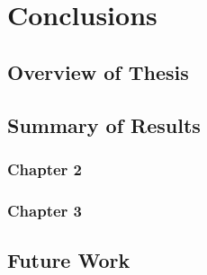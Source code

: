 \chapter{Conclusions}

\section{Overview of Thesis}

\section{Summary of Results}

\subsection{Chapter 2}

\subsection{Chapter 3}

\section{Future Work}
